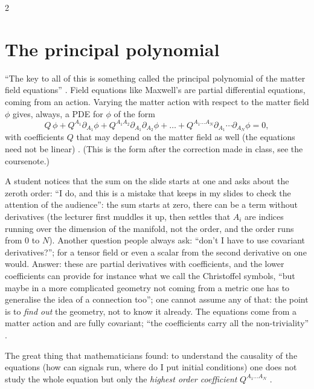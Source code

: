 \begin{paracol}{2}
\section{The principal polynomial}\label{sec:c26-principal}

``The key to all of this is something called the principal polynomial of the matter field equations'' . Field equations like Maxwell's are partial differential equations, coming from an action. Varying the matter action with respect to the matter field $\phi$ gives, always, a PDE for $\phi$ of the form
\[
  Q^{\,}\phi+Q^{A_1}\partial_{A_1}\phi+Q^{A_1A_2}\partial_{A_1}\partial_{A_2}\phi+\dots+Q^{A_1\dots A_N}\partial_{A_1}\cdots\partial_{A_N}\phi=0,
\]
with coefficients $Q$ that may depend on the matter field as well (the equations need not be linear) . (This is the form after the correction made in class, see the coursenote.)

\begin{coursenote}
A student notices that the sum on the slide starts at one and asks about the zeroth order: ``I do, and this is a mistake that keeps in my slides to check the attention of the audience'': the sum starts at zero, there can be a term without derivatives (the lecturer first muddles it up, then settles that $A_i$ are indices running over the dimension of the manifold, not the order, and the order runs from $0$ to $N$). Another question people always ask: ``don't I have to use covariant derivatives?''; for a tensor field or even a scalar from the second derivative on one would. Answer: these are partial derivatives with coefficients, and the lower coefficients can provide for instance what we call the Christoffel symbols, ``but maybe in a more complicated geometry not coming from a metric one has to generalise the idea of a connection too''; one cannot assume any of that: the point is to \emph{find out} the geometry, not to know it already. The equations come from a matter action and are fully covariant; ``the coefficients carry all the non-triviality'' .
\end{coursenote}

The great thing that mathematicians found: to understand the causality of the equations (how can signals run, where do I put initial conditions) one does not study the whole equation but only the \emph{highest order coefficient} $Q^{A_1\dots A_N}$ .


\end{paracol}
